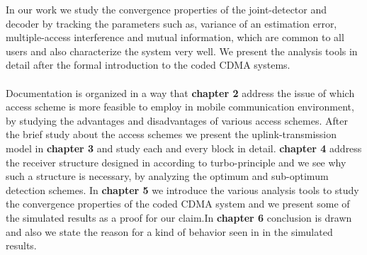 In our work we study the convergence properties of the joint-detector and decoder by tracking the parameters such as, variance of an estimation error, multiple-access interference and mutual information, which are common to all users and also characterize the system very well. We present the analysis tools in detail after the formal introduction to the coded CDMA systems. \\ \\
Documentation is organized in a way that \textbf{chapter 2} address the issue of which access scheme is more feasible to employ in mobile communication environment, by studying the advantages and disadvantages of various access schemes. After the brief study about the access schemes we present the uplink-transmission model in \textbf{chapter 3} and study each and every block in detail. \textbf{chapter 4} address the receiver structure designed in according to turbo-principle and we see why such a structure is necessary, by analyzing the optimum and sub-optimum detection schemes. In \textbf{chapter 5} we introduce the various analysis tools to study the convergence properties of the coded CDMA system and we present some of the simulated results as a proof for our claim.In \textbf{chapter 6} conclusion is drawn and also we state the reason for a kind of behavior seen in in the simulated results.
	
	

	



